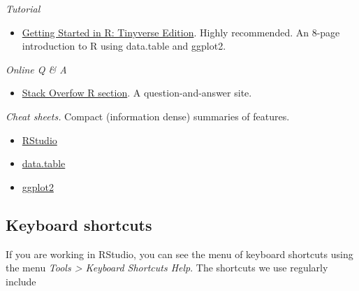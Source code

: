 \documentclass[
]{book}
\providecommand{\tightlist}{%
  \setlength{\itemsep}{0pt}\setlength{\parskip}{0pt}}
\begin{document}
\emph{Tutorial}

\begin{itemize}
\tightlist
\item
  \href{https://eddelbuettel.github.io/gsir-te/Getting-Started-in-R.pdf}{Getting Started in R: Tinyverse Edition}. Highly recommended. An 8-page introduction to R using data.table and ggplot2.
\end{itemize}

\emph{Online Q \& A}

\begin{itemize}
\tightlist
\item
  \href{https://stackoverflow.com/questions/tagged/r}{Stack Overfow R section}. A question-and-answer site.
\end{itemize}

\emph{Cheat sheets.} Compact (information dense) summaries of features.

\begin{itemize}
\tightlist
\item
  \href{https://github.com/rstudio/cheatsheets/raw/master/rstudio-ide.pdf}{RStudio}
\item
  \href{https://raw.githubusercontent.com/rstudio/cheatsheets/master/datatable.pdf}{data.table}
\item
  \href{https://github.com/rstudio/cheatsheets/raw/master/data-visualization-2.1.pdf}{ggplot2}
\end{itemize}

\hypertarget{keyboard-shortcuts}{%
\subsection{Keyboard shortcuts}\label{keyboard-shortcuts}}

If you are working in RStudio, you can see the menu of keyboard
shortcuts using the menu \emph{Tools \textgreater{} Keyboard Shortcuts Help}. The
shortcuts we use regularly include
\end{document}
